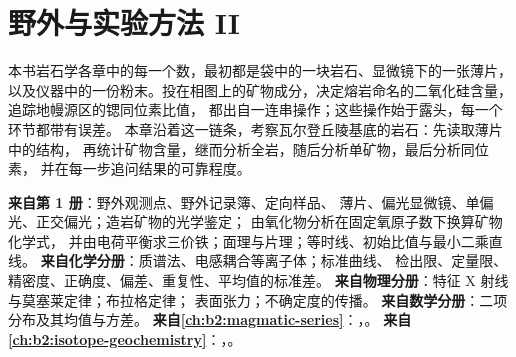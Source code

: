\chapter{野外与实验方法 II}\label{ch:b2:field-lab-methods-2}

本书岩石学各章中的每一个数，最初都是袋中的一块岩石、显微镜下的一张薄片，
以及仪器中的一份粉末。投在相图上的矿物成分，决定熔岩命名的二氧化硅含量，
追踪地幔源区的锶同位素比值，
都出自一连串操作；这些操作始于露头，每一个环节都带有误差。
本章沿着这一链条，考察瓦尔登丘陵基底的岩石：先读取薄片中的结构，
再统计矿物含量，继而分析全岩，随后分析单矿物，最后分析同位素，
并在每一步追问结果的可靠程度。

\begin{recall}
\textbf{来自第 1 册}：野外观测点、野外记录簿、定向样品、
薄片、偏光显微镜、单偏光、正交偏光；造岩矿物的光学鉴定；
由氧化物分析在固定氧原子数下换算矿物化学式，
并由电荷平衡求三价铁；面理与片理；等时线、初始比值与最小二乘直线。
\textbf{来自化学分册}：质谱法、电感耦合等离子体；标准曲线、
检出限、定量限、精密度、正确度、偏差、重复性、平均值的标准差。
\textbf{来自物理分册}：特征 X 射线与莫塞莱定律；布拉格定律；
表面张力；不确定度的传播。
\textbf{来自数学分册}：二项分布及其均值与方差。
\textbf{来自\cref{ch:b2:magmatic-series}}：，。
\textbf{来自\cref{ch:b2:isotope-geochemistry}}：，。
\end{recall}

